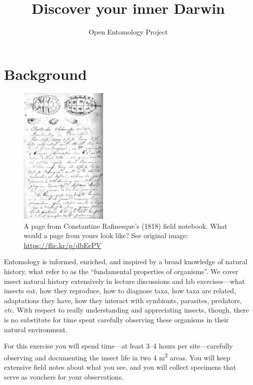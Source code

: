 \documentclass[letterpaper, 11pt]{article}
\title{Discover your inner Darwin}%
\author{Open Entomology Project}
\begin{document}
\cleanlookdateon %
\maketitle
\thispagestyle{fancy}

\section*{Background}
\begin{figure}
  \vspace{-20pt}
  \begin{center}
    \includegraphics[width=0.38\textwidth]{Rafinesque}
  \end{center}
  \vspace{-16pt}
  \caption{A page from Constantine Rafinesque's (1818) field notebook. What would a page from yours look like? See original image: \url{https://flic.kr/p/dbEePV}}
  \vspace{-38pt}
\end{figure}
Entomology is informed, enriched, and inspired by a broad knowledge of natural history, what \cite{Tewksbury01042014} refer to as the ``fundamental properties of organisms''. We cover insect natural history extensively in lecture discussions and lab exercises---what insects eat, how they reproduce, how to diagnose taxa, how taxa are related, adaptations they have, how they interact with symbionts, parasites, predators, \textit{etc}. With respect to really understanding and appreciating insects, though, there is no substitute for time spent carefully observing these organisms in their natural environment. 

For this exercise you will spend time---at least 3--4 hours per site---carefully observing and documenting the insect life in two 4 m\textsuperscript{2} areas. You will keep extensive field notes about what you see, and you will collect specimens that serve as vouchers for your observations.
\end{document}
